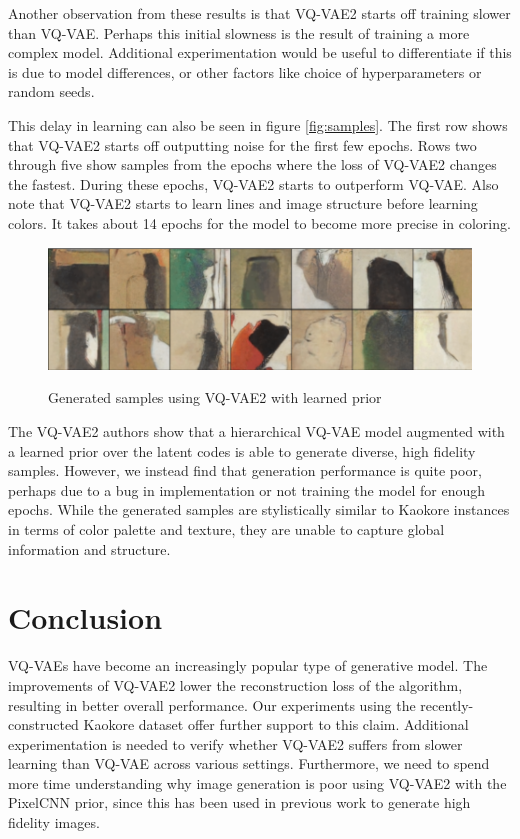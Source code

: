 \documentclass{article}
\begin{document}
Another observation from these results is that VQ-VAE2 starts off training slower than VQ-VAE. Perhaps this initial slowness is the result of training a more complex model. Additional experimentation would be useful to differentiate if this is due to model differences, or other factors like choice of hyperparameters or random seeds. 

This delay in learning can also be seen in figure \ref{fig:samples}. The first row shows that VQ-VAE2 starts off outputting noise for the first few epochs. Rows two through five show samples from the epochs where the loss of VQ-VAE2 changes the fastest. During these epochs, VQ-VAE2 starts to outperform VQ-VAE. Also note that VQ-VAE2 starts to learn lines and image structure before learning colors. It takes about 14 epochs for the model to become more precise in coloring.

\begin{figure}[h]
    \centering
    \includegraphics[width=0.8\linewidth]{generations.png}
    \label{fig:generations}
    \caption{Generated samples using VQ-VAE2 with learned prior}
\end{figure}

The VQ-VAE2 authors show that a hierarchical VQ-VAE model augmented with a learned prior over the latent codes is able to generate diverse, high fidelity samples. However, we instead find that generation performance is quite poor, perhaps due to a bug in implementation or not training the model for enough epochs. While the generated samples are stylistically similar to Kaokore instances in terms of color palette and texture, they are unable to capture global information and structure. 


\section{Conclusion}

VQ-VAEs have become an increasingly popular type of generative model. The improvements of VQ-VAE2 lower the reconstruction loss of the algorithm, resulting in better overall performance. Our experiments using the recently-constructed Kaokore dataset offer further support to this claim. Additional experimentation is needed to verify whether VQ-VAE2 suffers from slower learning than VQ-VAE across various settings. Furthermore, we need to spend more time understanding why image generation is poor using VQ-VAE2 with the PixelCNN prior, since this has been used in previous work to generate high fidelity images. 



\end{document}
